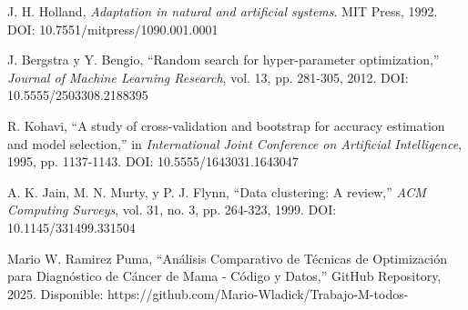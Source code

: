 \documentclass[conference]{IEEEtran}
\begin{document}
\begin{thebibliography}{00}
 J. H. Holland, \textit{Adaptation in natural and artificial systems}. MIT Press, 1992. DOI: 10.7551/mitpress/1090.001.0001

 J. Bergstra y Y. Bengio, ``Random search for hyper-parameter optimization,'' \textit{Journal of Machine Learning Research}, vol. 13, pp. 281-305, 2012. DOI: 10.5555/2503308.2188395

 R. Kohavi, ``A study of cross-validation and bootstrap for accuracy estimation and model selection,'' in \textit{International Joint Conference on Artificial Intelligence}, 1995, pp. 1137-1143. DOI: 10.5555/1643031.1643047

 A. K. Jain, M. N. Murty, y P. J. Flynn, ``Data clustering: A review,'' \textit{ACM Computing Surveys}, vol. 31, no. 3, pp. 264-323, 1999. DOI: 10.1145/331499.331504

 Mario W. Ramirez Puma, ``Análisis Comparativo de Técnicas de Optimización para Diagnóstico de Cáncer de Mama - Código y Datos,'' GitHub Repository, 2025. Disponible: https://github.com/Mario-Wladick/Trabajo-M-todos-

\end{thebibliography}
\end{document}
